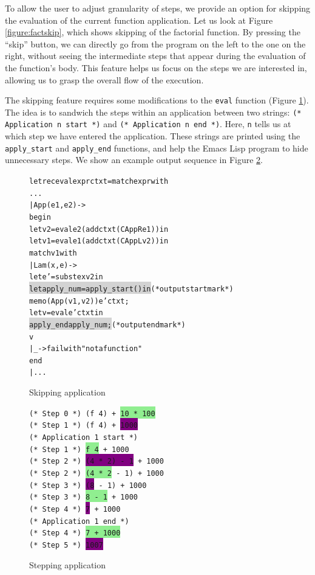 To allow the user to adjust granularity of steps, we provide an option for skipping the evaluation of the current function application.  Let us look at Figure \ref{figure:factskip}, which shows skipping of the factorial function.  By pressing the ``skip'' button, we can directly go from the program on the left to the one on the right, without seeing the intermediate steps that appear during the evaluation of the function's body.  This feature helps us focus on the steps we are interested in, allowing us to grasp the overall flow of the execution.

The skipping feature requires some modifications to the \texttt{eval} function (Figure \ref{figure:skipapp}).  The idea is to sandwich the steps within an application between two strings: \texttt{(* Application n start *)} and \texttt{(* Application n end *)}.  Here, \texttt{n} tells us at which step we have entered the application.  These strings are printed using the \texttt{apply\_start} and \texttt{apply\_end} functions, and help the Emacs Lisp program to hide unnecessary steps.  We show an example output sequence in Figure \ref{figure:skipping}.


\begin{figure}
\begin{alltt}
let rec eval expr ctxt = match expr with
    ...
  | App (e1, e2) ->
    begin
      let v2 = eval e2 (add ctxt (CAppR e1)) in
      let v1 = eval e1 (add ctxt (CAppL v2)) in
      match v1 with
      | Lam (x, e) ->
        let e' = subst e x v2 in
        \colorbox{lightgray}{let apply_num = apply_start () in}                (* output start mark *)
        memo (App (v1, v2)) e' ctxt;
        let v = eval e' ctxt in
        \colorbox{lightgray}{apply_end apply_num;}                               (* output end mark *)
        v
      | _ -> failwith "not a function"
    end
  | ...
\end{alltt}
\caption{Skipping application}
\label{figure:skipapp}
\end{figure}

\begin{figure}
\texttt{(* Step 0 *) (f 4) + \colorbox{lightgreen}{10 * 100}\\
(* Step 1 *) (f 4) + \colorbox{purple}{1000}\\
(* Application 1 start *)\\
(* Step 1 *) \colorbox{lightgreen}{f 4} + 1000\\
(* Step 2 *) \colorbox{purple}{(4 * 2) - 1} + 1000\\
(* Step 2 *) \colorbox{lightgreen}{(4 * 2} - 1) + 1000\\
(* Step 3 *) \colorbox{purple}{(8} - 1) + 1000\\
(* Step 3 *) \colorbox{lightgreen}{8 - 1} + 1000\\
(* Step 4 *) \colorbox{purple}{7} + 1000\\
(* Application 1 end *)\\
(* Step 4 *) \colorbox{lightgreen}{7 + 1000}\\
(* Step 5 *) \colorbox{purple}{1007}}
\caption{Stepping application}
\label{figure:skipping}
\end{figure}
